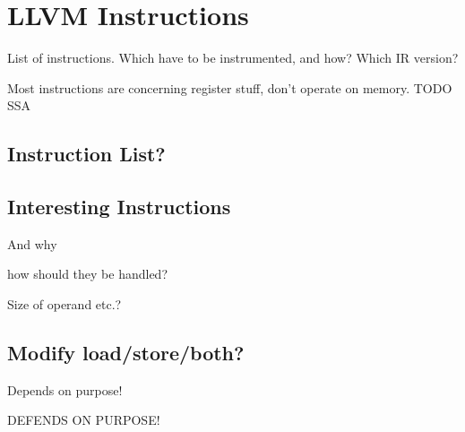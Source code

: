 \chapter {LLVM Instructions}

List of instructions. Which have to be instrumented, and how? Which IR version?

Most instructions are concerning register stuff, don't operate on memory. TODO
SSA

\section {Instruction List?}


\section {Interesting Instructions}

And why

how should they be handled?

Size of operand etc.?

\section {Modify load/store/both?}

Depends on purpose!

DEFENDS ON PURPOSE!
